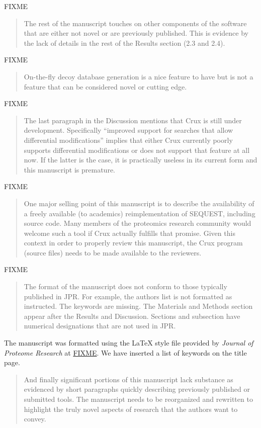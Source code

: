 \documentclass{article}
\newcommand{\breview}{\begin{quotation}\begin{em}\noindent}
\newcommand{\ereview}{\end{em}\end{quotation}}
\begin{document}
FIXME

\breview The rest of the manuscript touches on other components of the
software that are either not novel or are previously published.  This
is evidence by the lack of details in the rest of the Results section
(2.3 and 2.4).  \ereview

FIXME

\breview On-the-fly decoy database generation is a nice feature to
have but is not a feature that can be considered novel or cutting
edge. \ereview

FIXME

\breview The last paragraph in the Discussion mentions that Crux is
still under development.  Specifically ``improved support for searches
that allow differential modifications'' implies that either Crux
currently poorly supports differential modifications or does not
support that feature at all now.  If the latter is the case, it is
practically useless in its current form and this manuscript is
premature. \ereview

FIXME

\breview One major selling point of this manuscript is to describe the
availability of a freely available (to academics) reimplementation of
SEQUEST, including source code.  Many members of the proteomics
research community would welcome such a tool if Crux actually fulfills
that promise.  Given this context in order to properly review this
manuscript, the Crux program (source files) needs to be made available
to the reviewers. \ereview

FIXME

\breview The format of the manuscript does not conform to those
typically published in JPR.  For example, the authors list is not
formatted as instructed.  The keywords are missing.  The Materials and
Methods section appear after the Results and Discussion.  Sections and
subsection have numerical designations that are not used in
JPR. \ereview

The manuscript was formatted using the LaTeX style file provided by
{\em Journal of Proteome Research} at \url{FIXME}.  We have inserted a
list of keywords on the title page.

\breview And finally significant portions of this manuscript lack
substance as evidenced by short paragraphs quickly describing
previously published or submitted tools.  The manuscript needs to be
reorganized and rewritten to highlight the truly novel aspects of
research that the authors want to convey. \ereview
\end{document}
